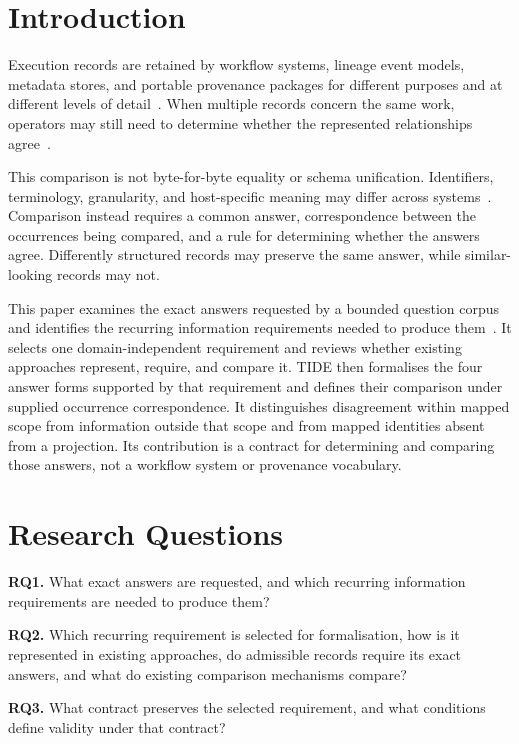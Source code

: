 \documentclass[conference]{IEEEtran}
\theoremstyle{tideproposition}
\begin{document}
\section{Introduction}
Execution records are retained by workflow systems, lineage event models, metadata stores, and portable provenance packages for different purposes and at different levels of detail~\cite{openlineage-object,mlmd-guide,wfrun}. When multiple records concern the same work, operators may still need to determine whether the represented relationships agree~\cite{mediator,ppif}.

This comparison is not byte-for-byte equality or schema unification. Identifiers, terminology, granularity, and host-specific meaning may differ across systems~\cite{wfrun,mediator}. Comparison instead requires a common answer, correspondence between the occurrences being compared, and a rule for determining whether the answers agree. Differently structured records may preserve the same answer, while similar-looking records may not.

This paper examines the exact answers requested by a bounded question corpus and identifies the recurring information requirements needed to produce them~\cite{artifact}. It selects one domain-independent requirement and reviews whether existing approaches represent, require, and compare it. TIDE then formalises the four answer forms supported by that requirement and defines their comparison under supplied occurrence correspondence. It distinguishes disagreement within mapped scope from information outside that scope and from mapped identities absent from a projection. Its contribution is a contract for determining and comparing those answers, not a workflow system or provenance vocabulary.

\section{Research Questions}

\textbf{RQ1.} What exact answers are requested, and which recurring information requirements are needed to produce them?

\textbf{RQ2.} Which recurring requirement is selected for formalisation, how is it represented in existing approaches, do admissible records require its exact answers, and what do existing comparison mechanisms compare?

\textbf{RQ3.} What contract preserves the selected requirement, and what conditions define validity under that contract?
\end{document}
